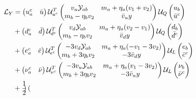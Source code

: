 \begin{align}
	\mathcal{L}_Y &= \begin{pmatrix}
		u^c_a & \bar{u}
	\end{pmatrix} \mathcal{U}^T_{u^c} \begin{pmatrix}
		v_u \mathcal{Y}_{ab} & m_a + \eta_a(v_1 + v_2) \\
		m_b - \eta_b v_2 & \bar{v}_u y
	\end{pmatrix} \mathcal{U}_Q \begin{pmatrix}
		u_b \\ \bar{u}^c
	\end{pmatrix} \notag \\
	&+ \begin{pmatrix}
		d^c_a & \bar{d}
	\end{pmatrix} \mathcal{U}^T_{d^c} \begin{pmatrix}
		v_d \mathcal{Y}_{ab} & m_a + \eta_a(v_2 - v_1) \\
		m_b - \eta_b v_2 & \bar{v}_d y
	\end{pmatrix} \mathcal{U}_Q \begin{pmatrix}
		d_b \\ \bar{d}^c
	\end{pmatrix} \notag \\
	&+ \begin{pmatrix}
		e_a^c & \bar{e}
	\end{pmatrix} \mathcal{U}^T_{e^c} \begin{pmatrix}
		-3v_d \mathcal{Y}_{ab} & m_a + \eta_a(-v_1 - 3v_2) \\
		m_b + 3 \eta_b v_2 & -3\bar{v}_d y
	\end{pmatrix} \mathcal{U}_{L} \begin{pmatrix}
		e_b \\ \bar{e}^c
	\end{pmatrix} \notag \\
	&+ \begin{pmatrix}
		\nu^c_a & \bar{\nu}
	\end{pmatrix} \mathcal{U}^T_{\nu^c} \begin{pmatrix}
		-3 v_u \mathcal{Y}_{ab} & m_a + \eta_a(v_1 - 3v_2) \\
		m_b + 3 \eta_b v_2 & -3\bar{v}_u y
	\end{pmatrix} \mathcal{U}_{L} \begin{pmatrix}
		\nu_b \\ \bar{\nu}^c
	\end{pmatrix} \notag \\
	&+ \frac{1}{2} \begin{pmatrix}

\end{pmatrix}
\end{align}
